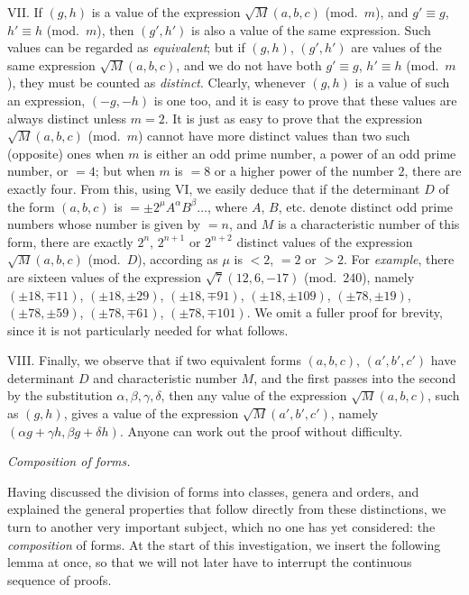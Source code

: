VII. If $(g,h)$ is a value of the expression $\surd M(a,b,c)$ (mod.\ $m$), and $g'\equiv g$, $h'\equiv h$ (mod.\ $m$), then $(g',h')$ is also a value of the same expression. Such values can be regarded as \textit{equivalent}; but if $(g,h)$, $(g',h')$ are values of the same expression $\surd M(a,b,c)$, and we do not have both $g'\equiv g$, $h'\equiv h$ (mod.\ $m$), they must be counted as \textit{distinct}. Clearly, whenever $(g,h)$ is a value of such an expression, $(-g,-h)$ is one too, and it is easy to prove that these values are always distinct unless $m=2$. It is just as easy to prove that the expression $\surd M(a,b,c)$ (mod.\ $m$) cannot have more distinct values than two such (opposite) ones when $m$ is either an odd prime number, a power of an odd prime number, or $=4$; but when $m$ is $=8$ or a higher power of the number $2$, there are exactly four. From this, using VI, we easily deduce that if the determinant $D$ of the form $(a,b,c)$ is $=\pm2^\mu A^\alpha B^\beta\ldots$, where $A$, $B$, etc. denote distinct odd prime numbers whose number is given by $=n$, and $M$ is a characteristic number of this form, there are exactly $2^n$, $2^{n+1}$ or $2^{n+2}$ distinct values of the expression $\surd M(a,b,c)$ (mod.\ $D$), according as $\mu$ is $<2$, $=2$ or $>2$. For \textit{example}, there are sixteen values of the expression $\surd7(12,6,-17)$ (mod.\ $240$), namely $(\pm18,\mp11)$, $(\pm18,\pm29)$, $(\pm18,\mp91)$, $(\pm18,\pm109)$, $(\pm78,\pm19)$, $(\pm78,\pm59)$, $(\pm78,\mp61)$, $(\pm78,\mp101)$. We omit a fuller proof for brevity, since it is not particularly needed for what follows.

VIII. Finally, we observe that if two equivalent forms $(a,b,c)$, $(a',b',c')$ have determinant $D$ and characteristic number $M$, and the first passes into the second by the substitution $\alpha,\beta,\gamma,\delta$, then any value of the expression $\surd M(a,b,c)$, such as $(g,h)$, gives a value of the expression $\surd M(a',b',c')$, namely $(\alpha g+\gamma h,\beta g+\delta h)$. Anyone can work out the proof without difficulty.

\begin{center}
\textit{Composition of forms.}
\end{center}

Having discussed the division of forms into classes, genera and orders, and explained the general properties that follow directly from these distinctions, we turn to another very important subject, which no one has yet
considered: the \textit{composition} of forms. At the start of this investigation, we insert the following lemma at once, so that we will not later have to interrupt the continuous sequence of proofs.

